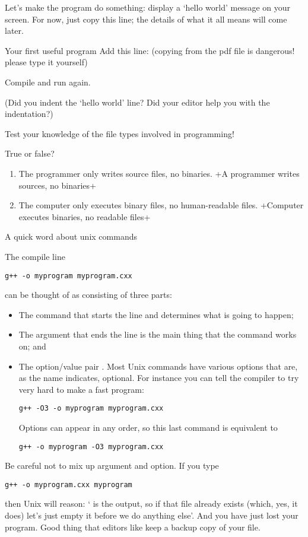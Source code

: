 Let's make the program do something:
display a `hello world' message on your screen.
For now, just copy this line; the details
of what it all means will come later.

\begin{exercise}{Your first useful program}
  \label{ex:sayhello}
Add this line:
%
%
(copying from the pdf file is dangerous! please type it yourself)

Compile and run again.

  (Did you indent the `hello world' line? Did your editor help you with
  the indentation?)
\end{exercise}

Test your knowledge of the file types involved in programming!

\begin{review}
  \label{q:compiler}
  True or false?
  \begin{enumerate}
  \item The programmer only writes source files, no binaries.
    \slackpollTF+A programmer writes sources, no binaries+
  \item The computer only executes binary files, no human-readable files.
    \slackpollTF+Computer executes binaries, no readable files+
  \end{enumerate}
\end{review}

 {A quick word about unix commands}

The compile line
\begin{verbatim}
g++ -o myprogram myprogram.cxx
\end{verbatim}
can be thought of as consisting of three parts:
\begin{itemize}
\item The command  that starts the line and determines what is
  going to happen;
\item The argument  that ends the line is the main
  thing that the command works on; and
\item The option/value pair . Most Unix commands have
  various options that are, as the name indicates, optional. For
  instance you can tell the compiler to try very hard to make a fast program:
\begin{verbatim}
g++ -O3 -o myprogram myprogram.cxx
\end{verbatim}
  Options can appear in any order, so this last command is equivalent to
\begin{verbatim}
g++ -o myprogram -O3 myprogram.cxx
\end{verbatim}
\end{itemize}
Be careful not to mix up argument and option. If you type
\begin{verbatim}
g++ -o myprogram.cxx myprogram
\end{verbatim}
then Unix will reason: ` is the output, so if that
file already exists (which, yes, it does) let's just empty it before
we do anything else'. And you have just lost your program.
Good thing that editors like
 keep a backup copy of your file.

